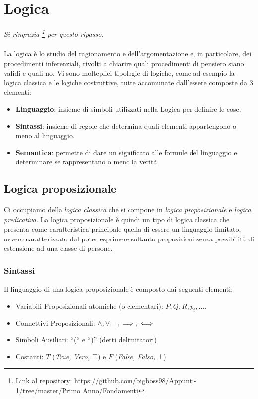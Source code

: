 \documentclass[a4paper,12pt, oneside]{book}
\begin{document}
\chapter{Logica}

\emph{Si ringrazia
  \footnote{Link al repository:
    https://github.com/bigboss98/Appunti-1/tree/master/Primo Anno/Fondamenti} per questo
  ripasso}.\\\\   
La logica è lo studio del ragionamento e dell’argomentazione e, in particolare,
dei procedimenti inferenziali, rivolti a chiarire quali	procedimenti di pensiero
siano validi e quali no. Vi sono molteplici tipologie di logiche, come ad
esempio la logica classica e le logiche costruttive, tutte accomunate dall'essere
composte da 3 elementi: 
\begin{itemize}
  \item \textbf{Linguaggio}: insieme di simboli utilizzati nella Logica per
  definire le cose.
  \item \textbf{Sintassi}: insieme di regole che determina quali elementi
  appartengono o meno al linguaggio.
  \item \textbf{Semantica}: permette di dare un significato alle formule del
  linguaggio e determinare se rappresentano o meno la verità.
\end{itemize}

\section{Logica proposizionale}
Ci occupiamo della \textit{logica classica} che si compone in \textit{logica proposizionale} 
e \textit{logica predicativa}.
La logica proposizionale è quindi un tipo di logica classica che presenta come
caratteristica principale quella di essere un linguaggio limitato, ovvero caratterizzato dal poter
esprimere soltanto proposizioni senza possibilità di estensione ad una
classe di persone.
\newpage
\subsection{Sintassi}
Il linguaggio di una logica proposizionale è composto dai seguenti elementi:

\begin{itemize}
  \item Variabili Proposizionali atomiche (o elementari): $P,Q,R,p_i, \dots$. 
  \item Connettivi Proposizionali: $\land, \lor, \neg, \implies, {\iff}$
  \item Simboli Ausiliari: ``(`` e ``)'' (detti delimitatori)
  \item Costanti: $T$ (\textit{True, Vero, $\top$}) e $F$ (\textit{False, Falso,
    $\bot$})
\end{itemize}
\end{document}
